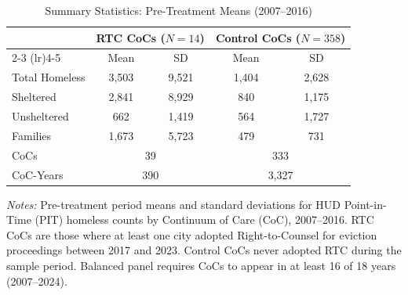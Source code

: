 \begin{table}[htbp]
\centering
\caption{Summary Statistics: Pre-Treatment Means (2007--2016)}
\label{tab:summary}
\begin{tabular}{lcccc}
\hline\hline
 & \multicolumn{2}{c}{RTC CoCs ($N=14$)} & \multicolumn{2}{c}{Control CoCs ($N=358$)} \\
\cmidrule(lr){2-3} \cmidrule(lr){4-5}
 & Mean & SD & Mean & SD \\
\hline
Total Homeless & 3,503 & 9,521 & 1,404 & 2,628 \\
\quad Sheltered & 2,841 & 8,929 & 840 & 1,175 \\
\quad Unsheltered & 662 & 1,419 & 564 & 1,727 \\
\quad Families & 1,673 & 5,723 & 479 & 731 \\
CoCs & \multicolumn{2}{c}{39} & \multicolumn{2}{c}{333} \\
CoC-Years & \multicolumn{2}{c}{390} & \multicolumn{2}{c}{3,327} \\
\hline\hline
\end{tabular}
\begin{tablenotes}
\item \textit{Notes:} Pre-treatment period means and standard deviations for HUD Point-in-Time (PIT) homeless counts by Continuum of Care (CoC), 2007--2016. RTC CoCs are those where at least one city adopted Right-to-Counsel for eviction proceedings between 2017 and 2023. Control CoCs never adopted RTC during the sample period. Balanced panel requires CoCs to appear in at least 16 of 18 years (2007--2024).
\end{tablenotes}
\end{table}
